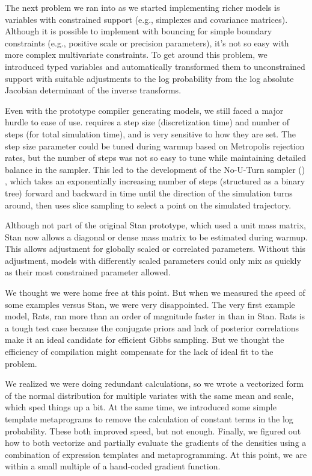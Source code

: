 The next problem we ran into as we started implementing richer models
is variables with constrained support (e.g., simplexes and covariance
matrices).  Although it is possible to implement \HMC with bouncing
for simple boundary constraints (e.g., positive scale or precision
parameters), it's not so easy with more complex multivariate
constraints.  To get around this problem, we introduced typed
variables and automatically transformed them to unconstrained support
with suitable adjustments to the log probability from the log absolute
Jacobian determinant of the inverse transforms.

Even with the prototype compiler generating models, we still faced a
major hurdle to ease of use.  \HMC requires a step size
(discretization time) and number of steps (for total simulation time),
and is very sensitive to how they are set.  The step size parameter
could be tuned during warmup based on Metropolis rejection rates, but
the number of steps was not so easy to tune while maintaining detailed
balance in the sampler.  This led to the development of the No-U-Turn
sampler (\NUTS) \citep{Hoffman-Gelman:2011, Hoffman-Gelman:2014},
which takes an exponentially increasing number of steps (structured as
a binary tree) forward and backward in time until the direction of the
simulation turns around, then uses slice sampling to select a point on
the simulated trajectory.

Although not part of the original Stan prototype, which used a unit
mass matrix, Stan now allows a diagonal or dense mass matrix to be
estimated during warmup.  This allows adjustment for globally scaled
or correlated parameters.  Without this adjustment, models with
differently scaled parameters could only mix as quickly as their most
constrained parameter allowed.

We thought we were home free at this point.  But when we measured the
speed of some \BUGS examples versus Stan, we were very disappointed.
The very first example model, Rats, ran more than an order of
magnitude faster in \JAGS than in Stan.  Rats is a tough test case
because the conjugate priors and lack of posterior correlations make
it an ideal candidate for efficient Gibbs sampling.  But we thought
the efficiency of compilation might compensate for the lack of ideal
fit to the problem.  

We realized we were doing redundant calculations, so we wrote a
vectorized form of the normal distribution for multiple variates with
the same mean and scale, which sped things up a bit. At the same time,
we introduced some simple template metaprograms to remove the
calculation of constant terms in the log probability.  These both
improved speed, but not enough.  Finally, we figured out how to both
vectorize and partially evaluate the gradients of the densities using
a combination of expression templates and metaprogramming.  At this
point, we are within a small multiple of a hand-coded gradient
function.

